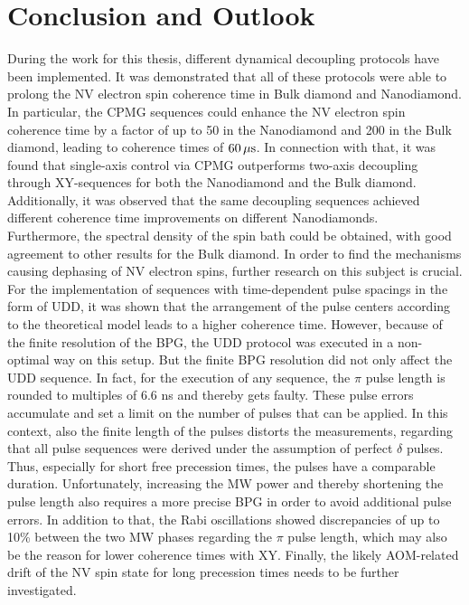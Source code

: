 \documentclass[12pt,a4paper]{article}
\begin{document}
\section{Conclusion and Outlook}
During the work for this thesis, different dynamical decoupling protocols have been implemented. It was demonstrated that all of these protocols were able to prolong the NV electron spin coherence time in Bulk diamond and Nanodiamond. In particular, the CPMG sequences could enhance the NV electron spin coherence time by a factor of up to 50 in the Nanodiamond and 200 in the Bulk diamond, leading to coherence times of $\unit[60]{\mu s}$. In connection with that, it was found that single-axis control via CPMG outperforms two-axis decoupling through XY-sequences for both the Nanodiamond and the Bulk diamond. Additionally, it was observed that the same decoupling sequences achieved different coherence time improvements on different Nanodiamonds.
\\
Furthermore, the spectral density of the spin bath could be obtained, with good agreement to other results for the Bulk diamond. In order to find the mechanisms causing dephasing of NV electron spins, further research on this subject is crucial.
\\
For the implementation of sequences with time-dependent pulse spacings in the form of UDD, it was shown that the arrangement of the pulse centers according to the theoretical model leads to a higher coherence time. However, because of the finite resolution of the BPG, the UDD protocol was executed in a non-optimal way on this setup. But the finite BPG resolution did not only affect the UDD sequence. In fact, for the execution of any sequence, the $\pi$ pulse length is rounded to multiples of 6.6 ns and thereby gets faulty. These pulse errors accumulate\cite{pea} and set a limit on the number of pulses that can be applied. In this context, also the finite length of the pulses distorts the measurements, regarding that all pulse sequences were derived under the assumption of perfect $\delta$ pulses. Thus, especially for short free precession times, the pulses have a comparable duration. Unfortunately, increasing the MW power and thereby shortening the pulse length also requires a more precise BPG in order to avoid additional pulse errors. In addition to that, the Rabi oscillations 
showed discrepancies of up to 10\% between the two MW phases regarding the $\pi$ pulse length, which may also be the reason for lower coherence times with XY. Finally, the likely AOM-related drift of the NV spin state for long precession times needs to be further investigated.\\







\end{document}
